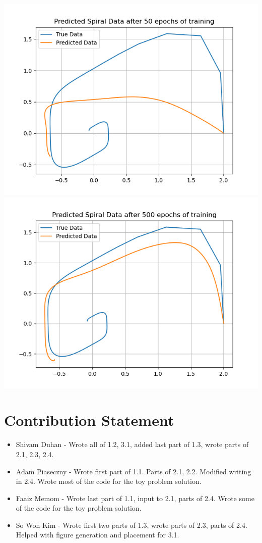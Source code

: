 \documentclass{article}
\begin{document}
\includegraphics[width = 0.48\linewidth, valign=m]{icml files/pred_spiral_50.png} \includegraphics[width = 0.48\linewidth, valign=m]{icml files/pred_spiral_500.png}



\section{Contribution Statement}
\begin{itemize} 
    \item Shivam Duhan - Wrote all of 1.2, 3.1, added last part of 1.3, wrote parts of 2.1, 2.3, 2.4.
    \item Adam Piaseczny - Wrote first part of 1.1. Parts of 2.1, 2.2. Modified writing in 2.4. Wrote most of the code for the toy problem solution.
    \item Faaiz Memom - Wrote last part of 1.1, input to 2.1, parts of 2.4. Wrote some of the code for the toy problem solution.
    \item So Won Kim - Wrote first two parts of 1.3, wrote parts of 2.3, parts of 2.4. Helped with figure generation and placement for 3.1.
\end{itemize}
    
\end{document}
